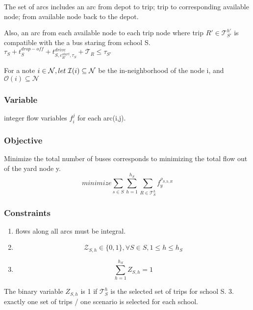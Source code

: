 The set of arcs includes an arc from depot to trip; trip to corresponding
available node; from available node back to the depot.

Also, an arc from each available node to each trip node where trip \(R' \in
\mathcal{T}_{S'}^{h'}\) is compatible with the a bus staring from school S.
\(\tau_S + t_S^{drop-off} + t_{S, c_{R'}^{start}, \tau_S}^{drive} + \mathcal{T}_R \le \tau_{S'}\)

For a note \(i \in \mathcal{N}, let \hspace{0.1cm} \mathcal{I}{(i)} \subseteq \mathcal{N}\) be the
in-neighborhood of the node i, and \(\mathcal{O}{(i)} \subseteq \mathcal{N}\)

\subsubsection{Variable}
\label{sec:orgb930100}
integer flow variables \(f_i^j\) for each arc(i,j).

\subsubsection{Objective}
\label{sec:orge3b2392}
Minimize the total number of buses corresponds to minimizing the total flow
out of the yard node y.
$$ minimize \sum_{s \in S}\sum_{h=1}^{h_S}\sum_{R \in \mathcal{T}_S^h}f_y^{\rho_{S,h,R}}$$ 

\subsubsection{Constraints}
\label{sec:org377563a}
\begin{enumerate}
\item flows along all arcs must be integral.
\item $$\mathcal{Z}_{S,h} \in \{0,1\}, \forall S \in S, 1 \le h \le h_S$$
\item $$\sum_{h=1}^{h_S}Z_{S,h} = 1$$
\end{enumerate}

The binary variable \(Z_{S,h}\) is 1 if \(\mathcal{T}_S^h\) is the selected set
of trips for school S. \(3\). exactly one set of trips / one scenario is
selected for each school.
